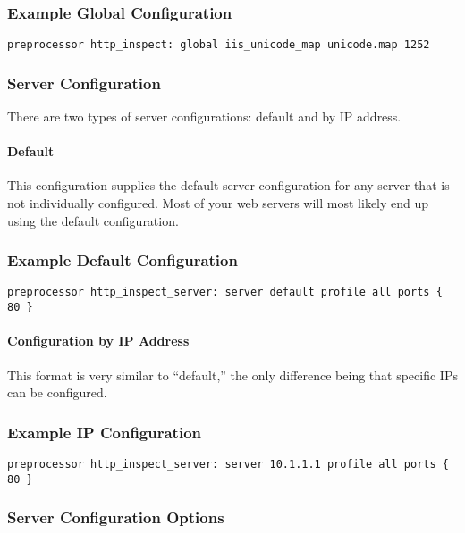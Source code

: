 \documentclass[english]{report}
\begin{document}
\subsubsection{Example Global Configuration}

\begin{verbatim}
preprocessor http_inspect: global iis_unicode_map unicode.map 1252
\end{verbatim}

\subsubsection{Server Configuration}
There are two types of server configurations: default and by IP address.

\paragraph{Default}

This configuration supplies the default server configuration for any server
that is not individually configured.  Most of your web servers will most likely
end up using the default configuration.

\subsubsection{Example Default Configuration}
\begin{verbatim}
preprocessor http_inspect_server: server default profile all ports { 80 }
\end{verbatim}

\paragraph{Configuration by IP Address}
This format is very similar to ``default,'' the only difference being that
specific IPs can be configured.

\subsubsection{Example IP Configuration}
\begin{verbatim}
preprocessor http_inspect_server: server 10.1.1.1 profile all ports { 80 }
\end{verbatim}

\subsubsection{Server Configuration Options}
\end{document}
